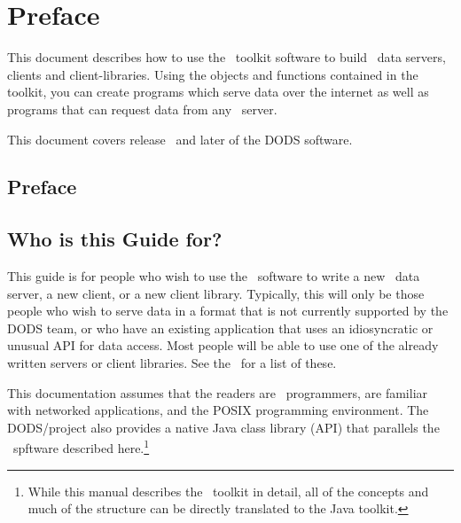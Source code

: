 %
%
%
%
%
%
%
%
%

\T\chapter*{Preface}
\T{}

This document describes how to use the \opendap\ toolkit software to build
\opendap\ data servers, clients and client-libraries. Using the objects and
functions contained in the toolkit, you can create programs which serve data
over the internet as well as programs that can request data from any
\opendap\ server.

This document covers release \DODSversion\ and later of the DODS
software.

\begin{ifhtml}
  \chapter*{Preface}
\end{ifhtml}

\section{Who is this Guide for?}
\label{pref,who}

This guide is for people who wish to use the \opendap\ software to write a
new \opendap\ data server, a new client, or a new client library. Typically,
this will only be those people who wish to serve data in a format that is not
currently supported by the DODS team, or who have an existing application
that uses an idiosyncratic or unusual API for data access. Most people will
be able to use one of the already written servers or client libraries. See
the \OPDuser\ for a list of these.

This documentation assumes that the readers are \Cpp\ programmers, are
familiar with networked applications, and the POSIX programming environment.
The DODS/\opendap project also provides a native Java class library (API)
that parallels the \Cpp\ spftware described here.\footnote{While this manual
describes the \Cpp\ toolkit in detail, all of the concepts and much of the
structure can be directly translated to the Java toolkit.}

